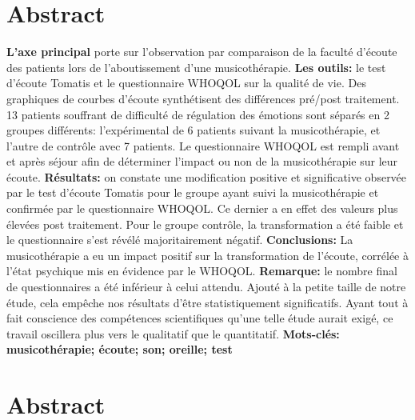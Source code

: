 \section*{Abstract}


\textbf{L'axe principal} porte sur l'observation par comparaison de la faculté d'écoute des patients lors 
de l'aboutissement d'une musicothérapie.
\textbf{Les outils:} le test d'écoute Tomatis et le questionnaire WHOQOL sur la qualité de vie.
 Des graphiques de courbes d'écoute synthétisent des différences pré/post traitement.
 13 patients souffrant de difficulté de régulation des émotions sont séparés en 2 
 groupes différents: l'expérimental de 6 patients suivant la musicothérapie, et l'autre de
 contrôle avec 7 patients. Le questionnaire WHOQOL est rempli avant et 
 après séjour afin de déterminer l'impact ou non de la musicothérapie sur leur écoute.
\textbf{Résultats:} on constate une modification positive et significative observée par le test d'écoute 
Tomatis pour le groupe ayant suivi la 
musicothérapie et confirmée par le questionnaire WHOQOL. Ce dernier a en effet des valeurs plus 
élevées 
post traitement. 
Pour le groupe contrôle, la transformation a été faible et le questionnaire s'est révélé majoritairement 
négatif.
\textbf{Conclusions:} La musicothérapie a eu un impact positif sur la transformation de l'écoute, corrélée 
à l'état psychique mis en évidence par le WHOQOL.
\textbf{Remarque:} le nombre final de questionnaires a été 
inférieur à celui attendu. Ajouté à la petite taille de notre étude, cela empêche nos résultats d'être 
statistiquement significatifs.
Ayant tout à fait conscience des compétences scientifiques qu'une telle étude aurait exigé, ce travail 
oscillera plus vers le qualitatif que le quantitatif.
\textbf{Mots-clés: musicothérapie; écoute; son; oreille; test}

\section*{Abstract}

